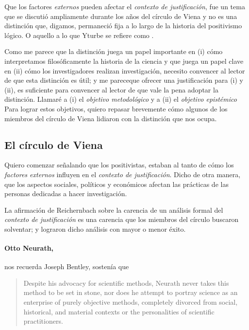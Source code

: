 Que los factores \emph{externos} pueden afectar el \emph{contexto de justificación}, fue un tema que se discutió ampliamente durante los años del círculo de Viena y no es una distinción que, digamos, permaneció fija a lo largo de la historia del positivismo lógico. 
O aquello a lo que Yturbe se refiere como .

Como me parece que la distinción juega un papel importante en (i) cómo interpretamos filosóficamente la historia de la ciencia y que juega un papel clave en (ii) cómo los investigadores realizan investigación, necesito convencer al lector de que esta distinción es útil; 
y me pareceque ofrecer una justificación para (i) y (ii), es suficiente para convencer al lector de que vale la pena adoptar la distinción.
Llamaré a (i) el \emph{objetivo metodológico} y a (ii) el \emph{objetivo epistémico}
Para lograr estos objetivos, quiero repasar brevemente cómo algunos de los miembros del círculo de Viena lidiaron con la distinción que nos ocupa.


\subsection{El círculo de Viena}

\noindent Quiero comenzar señalando que los positivistas, 
estaban al tanto de cómo los \emph{factores externos} influyen en el \emph{contexto de justificación}.
Dicho de otra manera, que los aspectos sociales, políticos y económicos afectan las prácticas de las personas dedicadas a hacer investigación.

La afirmación de Reichernbach sobre la carencia de un análisis formal del \emph{contexto de justificación} es una carencia que los miembros del círculo buscaron solventar; y lograron dicho análisis con mayor o menor éxito.

\paragraph{Otto Neurath,} nos recuerda Joseph Bentley, sostenía que

\begin{quote}
	Despite his advocacy for scientific methods, Neurath never takes this method to be set in stone, nor does he attempt to portray science as an enterprise of purely objective methods, completely divorced from social, historical, and material contexts or the personalities of scientific practitioners. \parencite[p.~41]{Bentley2023}
\end{quote}


